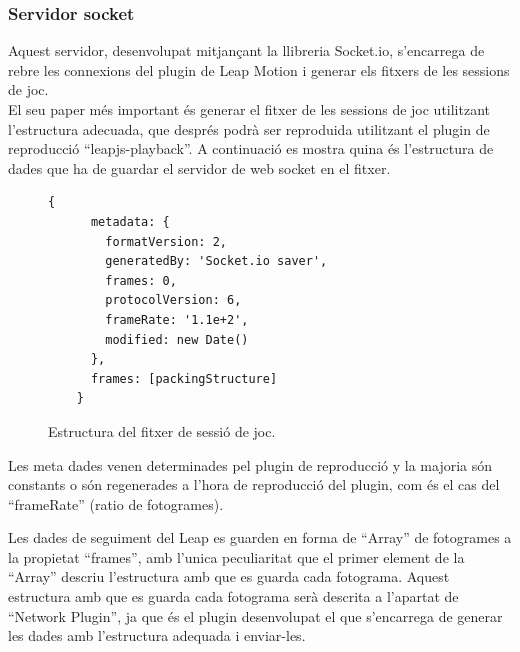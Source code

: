 \documentclass[12pt,a4paper,catalan]{article}
\begin{document}
	\subsubsection{Servidor socket}
	Aquest servidor, desenvolupat mitjançant la llibreria Socket.io, s'encarrega de rebre les connexions del plugin de Leap Motion i generar els fitxers de les sessions de joc.\\
	El seu paper més important és generar el fitxer de les sessions de joc utilitzant l'estructura adecuada, que després podrà ser reproduida utilitzant el plugin de reproducció “leapjs-playback”. A continuació es mostra quina és l'estructura de dades que ha de guardar el servidor de web socket en el fitxer.
	\begin{figure}[H]
	\begin{lstlisting}[]
	{
	  metadata: {
	    formatVersion: 2,
	    generatedBy: 'Socket.io saver',
	    frames: 0,
	    protocolVersion: 6,
	    frameRate: '1.1e+2',
	    modified: new Date()
	  },
	  frames: [packingStructure]
	}
	\end{lstlisting}
		\caption{Estructura del fitxer de sessió de joc.}
		\label{fig:recording-structure}
	\end{figure}
	Les meta dades venen determinades pel plugin de reproducció y la majoria són constants o són regenerades a l'hora de reproducció del plugin, com és el cas del “frameRate” (ratio de fotogrames).
	
	Les dades de seguiment del Leap es guarden en forma de “Array” de fotogrames a la propietat “frames”, amb l'unica peculiaritat que el primer element de la “Array” descriu l'estructura amb que es guarda cada fotograma. Aquest estructura amb que es guarda cada fotograma serà descrita a l'apartat de “Network Plugin”, ja que és el plugin desenvolupat el que s'encarrega de generar les dades amb l'estructura adequada i enviar-les.
	
\end{document}
